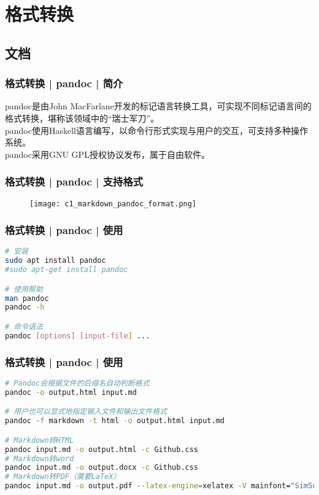 \section{格式转换}
\subsection{文档}
\begin{frame}
  \frametitle{格式转换 | pandoc | 简介}
  pandoc是由John MacFarlane开发的标记语言转换工具，可实现不同标记语言间的格式转换，堪称该领域中的“瑞士军刀”。\\
  \vspace{1em}
  pandoc使用Haskell语言编写，以命令行形式实现与用户的交互，可支持多种操作系统。\\
  \vspace{1em}
  pandoc采用GNU GPL授权协议发布，属于自由软件。
\end{frame}

\begin{frame}
  \frametitle{格式转换 | pandoc | 支持格式}
  \begin{figure}
    \centering
    \texttt{[image: c1\_markdown\_pandoc\_format.png]}
  \end{figure}
\end{frame}

\begin{frame}[fragile]
  \frametitle{格式转换 | pandoc | 使用}
\begin{lstlisting}[language=bash]
# 安装
sudo apt install pandoc
#sudo apt-get install pandoc

# 使用帮助
man pandoc
pandoc -h

# 命令语法
pandoc [options] [input-file] ...
\end{lstlisting}
\end{frame}

\begin{frame}[fragile]
  \frametitle{格式转换 | pandoc | \alert{使用}}
\begin{lstlisting}[language=bash]
# Pandoc会根据文件的后缀名自动判断格式
pandoc -o output.html input.md

# 用户也可以显式地指定输入文件和输出文件格式
pandoc -f markdown -t html -o output.html input.md

# Markdown转HTML
pandoc input.md -o output.html -c Github.css
# Markdown转word
pandoc input.md -o output.docx -c Github.css
# Markdown转PDF（需要LaTeX）
pandoc input.md -o output.pdf --latex-engine=xelatex -V mainfont="SimSun" --template=template.latex
\end{lstlisting}
\end{frame}

